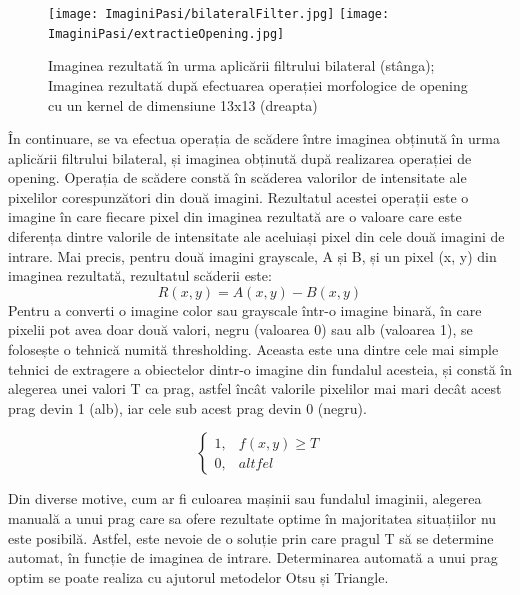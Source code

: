 \documentclass[12pt]{article}
\begin{document}
\begin{figure}[H]
  \centering
  \texttt{[image: ImaginiPasi/bilateralFilter.jpg]}\hfill
  \texttt{[image: ImaginiPasi/extractieOpening.jpg]}
  \caption{Imaginea rezultat\u{a} \^{i}n urma aplic\u{a}rii filtrului bilateral (st\^{a}nga); Imaginea rezultat\u{a} dup\u{a} efectuarea operației morfologice de opening cu un kernel de dimensiune 13x13 (dreapta)}
  \label{fig:opening_grayscale}
\end{figure}

\^{I}n continuare, se va efectua operația de sc\u{a}dere \^{i}ntre imaginea obținut\u{a} \^{i}n urma aplic\u{a}rii filtrului bilateral, și imaginea obținut\u{a} dup\u{a} realizarea operației de opening. Operația de sc\u{a}dere const\u{a} \^{i}n sc\u{a}derea valorilor de intensitate ale pixelilor corespunz\u{a}tori din dou\u{a} imagini. Rezultatul acestei operații este o imagine \^{i}n care fiecare pixel din imaginea rezultat\u{a} are o valoare care este diferența dintre valorile de intensitate ale aceluiași pixel din cele două imagini de intrare.
Mai precis, pentru dou\u{a} imagini grayscale, A și B, și un pixel (x, y) din imaginea rezultat\u{a}, rezultatul sc\u{a}derii este:
\begin{equation}
    R(x, y) = A(x, y) - B(x,y)    
\end{equation}
Pentru a converti o imagine color sau grayscale \^{i}ntr-o imagine binar\u{a}, \^{i}n care pixelii pot avea doar dou\u{a} valori, negru (valoarea 0) sau alb (valoarea 1), se folosește o tehnic\u{a} numit\u{a} thresholding. Aceasta este una dintre cele mai simple tehnici de extragere a obiectelor dintr-o imagine din fundalul acesteia, și const\u{a} \^{i}n alegerea unei valori T ca prag, astfel \^{i}nc\^{a}t valorile pixelilor mai mari dec\^{a}t acest prag devin 1 (alb), iar cele sub acest prag devin 0 (negru).

\begin{equation}
\begin{cases}
1, & f(x,y) \geq T \\
0, & altfel
\end{cases}
\end{equation}

Din diverse motive, cum ar fi culoarea mașinii sau fundalul imaginii, alegerea manual\u{a} a unui prag care sa ofere rezultate optime \^{i}n majoritatea situațiilor nu este posibil\u{a}. Astfel, este nevoie de o soluție prin care pragul T s\u{a} se determine automat, \^{i}n funcție de imaginea de intrare. Determinarea automat\u{a} a unui prag optim se poate realiza cu ajutorul metodelor Otsu și Triangle.
\end{document}
